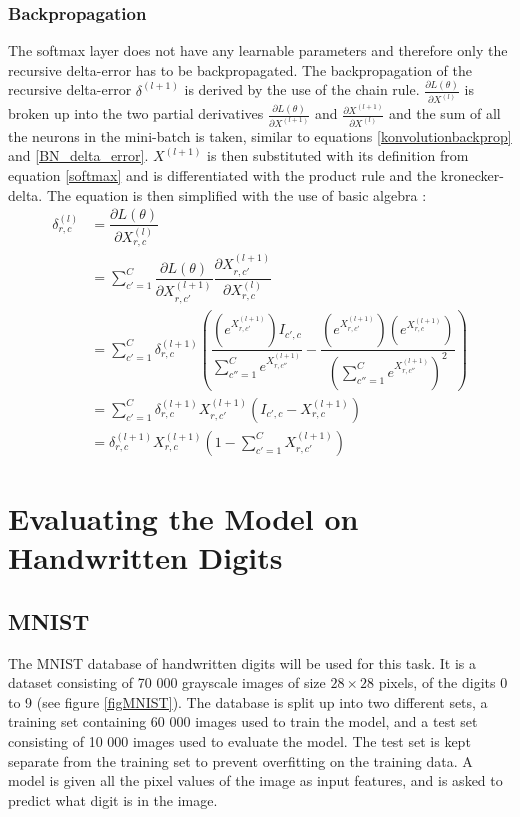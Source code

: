 \documentclass[a4paper, twoside]{article}
\newcommand*{\pd}[2]{\ensuremath{\dfrac{\partial #1}{\partial #2}}}
\newcommand*{\inpd}[2]{\ensuremath{\frac{\partial #1}{\partial #2}}}
\begin{document}
\subsubsection{Backpropagation}
The softmax layer does not have any learnable parameters and therefore only the recursive delta-error has to be backpropagated. The backpropagation of the recursive delta-error $\delta^{(l+1)}$ is derived by the use of the chain rule. $\inpd{L(\theta)}{X^{(l)}}$ is broken up into the two partial derivatives $\inpd{L(\theta)}{X^{(l+1)}}$ and $\inpd{X^{(l+1)}}{X^{(l)}}$ and the sum of all the neurons in the mini-batch is taken, similar to equations \eqref{konvolutionbackprop} and \eqref{BN_delta_error}. $X^{(l+1)}$ is then substituted with its definition from equation \eqref{softmax} and is differentiated with the product rule and the kronecker-delta. The equation is then simplified with the use of basic algebra \cite{cs231n} \cite{notesonbackprop} \cite{websoftmax}: 
\begin{equation}
\begin{split}
\delta^{(l)}_{r,c}
		& = \pd{L(\theta)}{X^{(l)}_{r,c}} \\
		& = \sum^{C }_{c'=1} \pd{L(\theta)}{X^{(l+1)}_{r,c'}} \pd{X^{(l+1)}_{r,c'}}{X^{(l)}_{r,c}} \\
		& = \sum^{C }_{c'=1} \delta^{(l+1)}_{r,c} \left(  \dfrac{(e^{X^{(l+1)}_{r,c'}})I_{c',c}}{\sum^{C }_{c''=1}e^{X^{(l+1)}_{r,c''}}} - \dfrac{(e^{X^{(l+1)}_{r,c'}})(e^{X^{(l+1)}_{r,c}})}{(\sum^{C }_{c''=1}e^{X^{(l+1)}_{r,c''}})^2} \right) \\
		& = \sum^{C }_{c'=1}  \delta^{(l+1)}_{r,c} X^{(l+1)}_{r,c'}(I_{c',c}-X^{(l+1)}_{r,c}) \\
		& = \delta^{(l+1)}_{r,c} X^{(l+1)}_{r,c} \left( 1-\sum^{C }_{c'=1} X^{(l+1)}_{r,c'} \right)
\end{split}
\end{equation}

\section{Evaluating the Model on Handwritten Digits}
\subsection{MNIST}
The MNIST database of handwritten digits \cite{MNIST} will be used for this task. It is a dataset consisting of 70 000 grayscale images of size $28 \times 28$ pixels, of the digits 0 to 9 (see figure \ref{figMNIST}). The database is split up into two different sets, a training set containing 60 000 images used to train the model, and a test set consisting of 10 000 images used to evaluate the model. The test set is kept separate from the training set to prevent overfitting on the training data. A model is given all the pixel values of the image as input features, and is asked to predict what digit is in the image.
\end{document}
